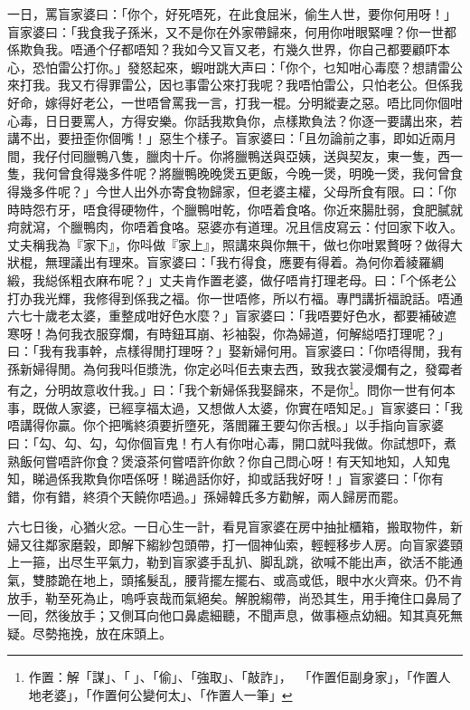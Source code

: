 \documentclass[a5paper, 12pt, openany]{book} %
\begin{document}
	一日，罵盲家婆曰：「你个，好死唔死，在此食屈米，偷生人世，要你何用呀！」盲家婆曰：「我食我子孫米，又不是你在外家帶歸來，何用你咁眼緊哩？你一世都係欺負我。唔通个仔都唔知？我如今又盲又老，冇幾久世界，你自己都要顧吓本心，恐怕雷公打你。」發怒起來，蝦咁跳大声曰：「你个，乜知咁心毒麼？想請雷公來打我。我又冇得罪雷公，因乜事雷公來打我呢？我唔怕雷公，只怕老公。但係我好命，嫁得好老公，一世唔曾罵我一言，打我一棍。分明縱妻之惡。唔比同你個咁心毒，日日要罵人，方得安樂。你話我欺負你，点樣欺負法？你逐一要講出來，若講不出，要扭歪你個嘴！」惡生个樣子。盲家婆曰：「且勿論前之事，即如近兩月間，我仔付囘臘鴨八隻，臘肉十斤。你將臘鴨送與亞姨，送與契友，東一隻，西一隻，我何曾食得幾多件呢？將臘鴨晚晚煲五更飯，今晚一煲，明晚一煲，我何曾食得幾多件呢？」今世人出外亦寄食物歸家，但老婆主權，父母所食有限。曰：「你時時怨冇牙，唔食得硬物件，个臘鴨咁乾，你唔着食咯。你近來腸肚弱，食肥膩就疴就瀉，个臘鴨肉，你唔着食咯。惡婆亦有道理。况且信皮寫云：付回家下收入。丈夫稱我為『家下』，你呌做『家上』，照講來與你無干，做乜你咁累贅呀？做得大狀棍，無理議出有理來。盲家婆曰：「我冇得食，應要有得着。為何你着綾羅綢緞，我縂係粗衣麻布呢？」丈夫肯作置老婆，做仔唔肯打理老母。曰：「个係老公打办我光輝，我修得到係我之福。你一世唔修，所以冇福。專門講折福說話。唔通六七十歲老太婆，重整成咁好色水麼？」盲家婆曰：「我唔要好色水，都要補破遮寒呀！為何我衣服穿爛，有時鈕耳崩、衫袖裂，你為婦道，何解縂唔打理呢？」曰：「我有我事幹，点樣得閒打理呀？」娶新婦何用。盲家婆曰：「你唔得閒，我有孫新婦得閒。為何我呌佢漿洗，你定必呌佢去東去西，致我衣裳浸爛有之，發霉者有之，分明故意收什我。」曰：「我个新婦係我娶歸來，不是你\footnote{作置：解「謀」、「」、「偷」、「強取」、「敲詐」，「作置佢副身家」，「作置人地老婆」，「作置何公變何太」、「作置人一筆」}。問你一世有何本事，既做人家婆，已經享福太過，又想做人太婆，你實在唔知足。」盲家婆曰：「我唔講得你贏。你个把嘴終須要折墮死，落閻羅王要勾你舌根。」以手指向盲家婆曰：「勾、勾、勾，勾你個盲鬼！冇人有你咁心毒，開口就呌我做。你試想吓，煮熟飯何嘗唔許你食？煲滾茶何嘗唔許你飲？你自己問心呀！有天知地知，人知鬼知，睇過係我欺負你唔係呀！睇過話你好，抑或話我好呀！」盲家婆曰：「你有錯，你有錯，終須个天饒你唔過。」孫婦韓氏多方勸解，兩人歸房而罷。

	六七日後，心猶火忿。一日心生一計，看見盲家婆在房中抽扯櫃箱，搬取物件，新婦又往鄰家磨榖，即解下縐紗包頭帶，打一個神仙索，輕輕移步人房。向盲家婆頸上一箍，出尽生平氣力，勒到盲家婆手乱扒、脚乱跳，欲喊不能出声，欲活不能通氣，雙膝跪在地上，頭搖髮乱，腰背擺左擺右、或高或低，眼中水火齊來。仍不肯放手，勒至死為止，嗚呼哀哉而氣絕矣。解脫縐帶，尚恐其生，用手掩住口鼻局了一囘，然後放手；又側耳向他口鼻處細聽，不聞声息，做事極点幼細。知其真死無疑。尽勢拖挽，放在床頭上。
\end{document}
